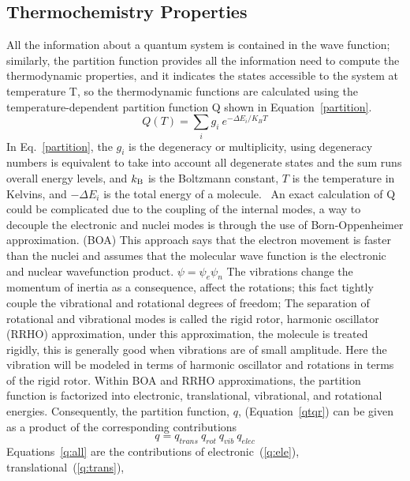 \documentclass[prb,aps,preprint,showkeys,showpacs]{revtex4}
\begin{document}
\subsection{Thermochemistry Properties}
All the information about a quantum system is contained in the wave function; similarly, the partition function provides all the information need to compute the thermodynamic properties, and it indicates the states accessible to the system at temperature T, so the thermodynamic functions are calculated using the temperature-dependent partition function Q shown in Equation~\ref{partition}.
\begin{equation}
\displaystyle
Q(T)=\sum_{i}g_i~e^{{-\Delta{E_i}}/{K_BT}}
\label{partition}
\end{equation}
In Eq.~\ref{partition}, the $g_i$ is the degeneracy or multiplicity, using degeneracy numbers is equivalent to take into account all degenerate states and the sum runs overall energy levels,  and $k_{\textup{B}}$ is the Boltzmann constant, $T$ is the temperature in Kelvins, and ${-\Delta{E_i}}$ is the total energy of a molecule.~\cite{Dzib,mcquarrie1975statistical}  An exact calculation of Q could be complicated due to the coupling of the internal modes, a way to decouple the electronic and nuclei modes is through the use of Born-Oppenheimer approximation. (BOA) This approach says that the electron movement is faster than the nuclei and assumes that the molecular wave function is the electronic and nuclear wavefunction product. $\psi=\psi_e\psi_n$
The vibrations change the momentum of inertia as a consequence, affect the rotations; this fact tightly couple the vibrational and rotational degrees of freedom; The separation of rotational and vibrational modes is called the rigid rotor, harmonic oscillator (RRHO) approximation, under this approximation, the molecule is treated rigidly,   this is generally good when vibrations are of small amplitude.
Here the vibration will be modeled in terms of harmonic oscillator and rotations in terms of the rigid rotor. Within BOA and RRHO approximations,  the partition function is factorized into electronic, translational, vibrational, and rotational energies. Consequently, the partition function, $q$, (Equation~\ref{qtqr}) can be given as a product of the corresponding contributions~\cite{hill1986introduction,Dzib}
\begin{equation}  
\displaystyle
q=q_{trans}~q_{rot}~q_{vib}~q_{elec}
\label{qtqr}
\end{equation}
Equations~\ref{q:all} are the contributions of electronic~(\ref{q:ele}), translational~(\ref{q:trans}),
\end{document}
